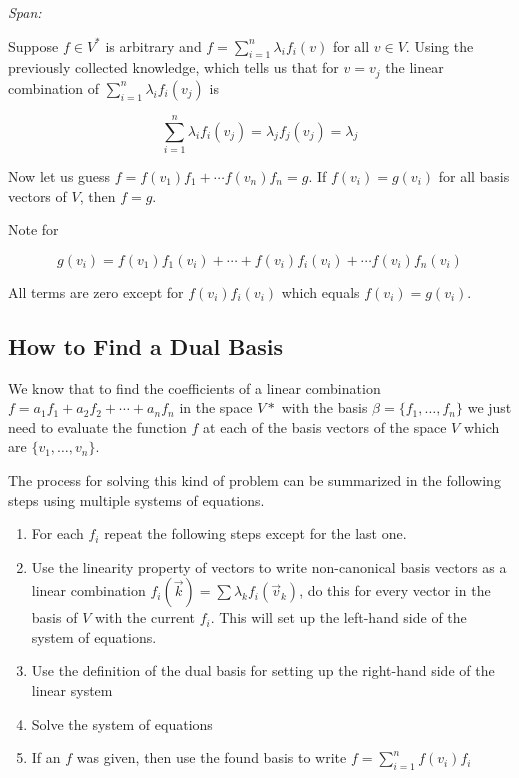 \emph{Span:}

Suppose \(f \in V^*\) is arbitrary and \(f = \sum_{i = 1}^{n} \lambda_i f_i(v)\) for all \(v \in V\).
Using the previously collected knowledge, which tells us that for \(v = v_j\) the linear
combination of \(\sum_{i = 1}^{n} \lambda_i f_i(v_j)\) is

\[
    \sum_{i = 1}^{n} \lambda_i f_i(v_j) = \lambda_j f_j(v_j) = \lambda_j
\]

Now let us guess \(f = f(v_1)f_1 + \cdots f(v_n)f_n = g \). If \(f(v_i) = g(v_i)\) for all basis
vectors of \(V\), then \(f = g\).

Note for

\[
    g(v_i) = f(v_1)f_1(v_i) + \cdots + f(v_i)f_i(v_i) + \cdots f(v_i)f_n(v_i)
\]

All terms are zero except for \( f(v_i)f_i(v_i) \) which equals \(f(v_i) = g(v_i)\).

\QED

\subsection{How to Find a Dual Basis}

We know that to find the coefficients of a linear combination \(f = a_1 f_1 + a_2 f_2 + \cdots + a_n f_n\)
in the space \(V*\) with the basis \(\beta = \{f_1, \dots, f_n\}\) we just need to evaluate the
function \(f\) at each of the basis vectors of the space \(V\) which are \(\{v_1, \dots, v_n\}\).

The process for solving this kind of problem can be summarized in the following steps using
multiple systems of equations.

\begin{enumerate}

    \item For each \(f_i\) repeat the following steps except for the last one.

    \item Use the linearity property of vectors to write non-canonical basis vectors as a linear
          combination \(f_i(\vec{k}) = \sum \lambda_k f_i(\vec{v}_k)\), do this for every vector
          in the basis of \(V\) with the current \(f_i\). This will set up the
          left-hand side of the system of equations.

    \item Use the definition of the dual basis for setting up the right-hand side of the linear system

    \item Solve the system of equations

    \item If an \(f\) was given, then use the found basis to write \(f = \sum_{i = 1}^{n} f(v_i)f_i\)

\end{enumerate}

